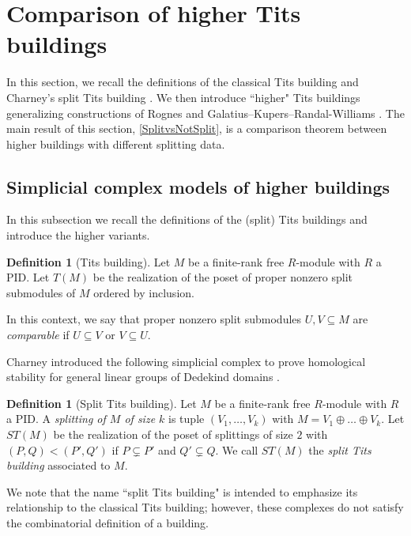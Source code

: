 \documentclass[a4paper]{amsart}
\numberwithin{theoremcounter}{section}
\theoremstyle{definition}
\newtheorem{definition}[Defauto]{Definition}
\theoremstyle{remark}
\begin{document}
\section{Comparison of higher Tits buildings} \label{Section-TheBuildings}

In this section, we recall the definitions of the classical Tits building and Charney's split Tits building \cite{Charney}.  We then introduce ``higher" Tits buildings generalizing constructions of Rognes \cite{Rog1} and Galatius--Kupers--Randal-Williams \cite{e2cellsIV}. The main result of this section, \autoref{SplitvsNotSplit}, is a comparison theorem between higher buildings with different splitting data. 


\subsection{Simplicial complex models of higher buildings}

In this subsection we recall the definitions of the (split) Tits buildings and introduce the higher variants. 

\begin{definition}[Tits building] 
Let $M$ be a finite-rank free $R$-module with $R$ a PID. Let $T(M)$ be the realization of the poset of proper nonzero split submodules of $M$ ordered by inclusion.  
\end{definition} 

In this context, we say that proper nonzero split submodules $U,V \subseteq M$ are \emph{comparable} if  $U \subseteq V$ or $V \subseteq U$. 



Charney introduced the following simplicial complex to prove homological stability for general linear groups of Dedekind domains \cite{Charney}.


\begin{definition}[Split Tits building]
Let $M$ be a finite-rank free $R$-module with $R$ a PID. A \emph{splitting of $M$ of size $k$}  is tuple $(V_1,\dots,V_k)$ with $M=V_1 \oplus \dots \oplus V_k$. Let $ST(M)$ be the realization of the poset of splittings of size $2$ with $(P,Q)<(P',Q')$ if $P \subsetneq P'$ and $Q' \subsetneq Q$. We call $ST(M)$ the \emph{split Tits building} associated to $M$. 
\end{definition}

We note that the name ``split Tits building" is intended to emphasize its relationship to the classical Tits building; however, these complexes do not satisfy the combinatorial definition of a building. 
\end{document}
